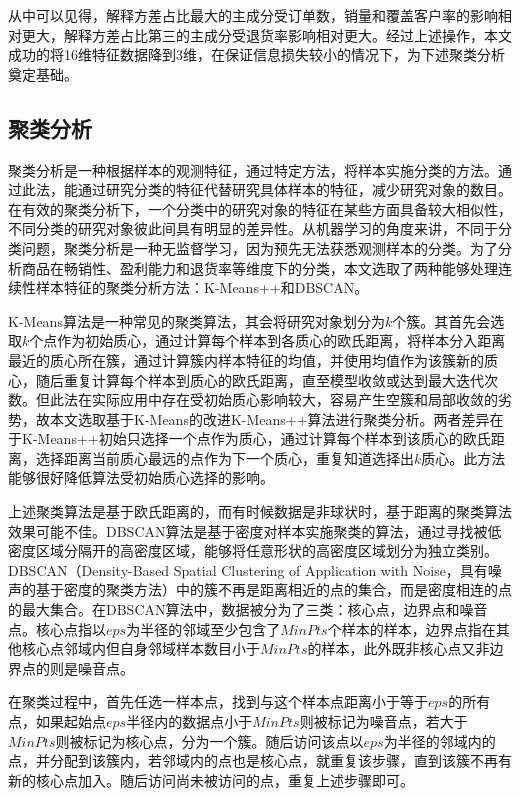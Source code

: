 \documentclass[lang=cn,11pt,a4paper,cite=authoryear]{elegantpaper}
\begin{document}
从中可以见得，解释方差占比最大的主成分受订单数，销量和覆盖客户率的影响相对更大，解释方差占比第三的主成分受退货率影响相对更大。经过上述操作，本文成功的将16维特征数据降到3维，在保证信息损失较小的情况下，为下述聚类分析奠定基础。

\subsection{聚类分析}

聚类分析是一种根据样本的观测特征，通过特定方法，将样本实施分类的方法。通过此法，能通过研究分类的特征代替研究具体样本的特征，减少研究对象的数目。在有效的聚类分析下，一个分类中的研究对象的特征在某些方面具备较大相似性，不同分类的研究对象彼此间具有明显的差异性。从机器学习的角度来讲，不同于分类问题，聚类分析是一种无监督学习，因为预先无法获悉观测样本的分类。为了分析商品在畅销性、盈利能力和退货率等维度下的分类，本文选取了两种能够处理连续性样本特征的聚类分析方法：K-Means++和DBSCAN。

K-Means算法是一种常见的聚类算法，其会将研究对象划分为$k$个簇。其首先会选取$k$个点作为初始质心，通过计算每个样本到各质心的欧氏距离，将样本分入距离最近的质心所在簇，通过计算簇内样本特征的均值，并使用均值作为该簇新的质心，随后重复计算每个样本到质心的欧氏距离，直至模型收敛或达到最大迭代次数。但此法在实际应用中存在受初始质心影响较大，容易产生空簇和局部收敛的劣势，故本文选取基于K-Means的改进K-Means++算法进行聚类分析。两者差异在于K-Means++初始只选择一个点作为质心，通过计算每个样本到该质心的欧氏距离，选择距离当前质心最远的点作为下一个质心，重复知道选择出$k$质心。此方法能够很好降低算法受初始质心选择的影响。

上述聚类算法是基于欧氏距离的，而有时候数据是非球状时，基于距离的聚类算法效果可能不佳。DBSCAN算法是基于密度对样本实施聚类的算法，通过寻找被低密度区域分隔开的高密度区域，能够将任意形状的高密度区域划分为独立类别。DBSCAN（Density-Based Spatial Clustering of Application with Noise，具有噪声的基于密度的聚类方法）中的簇不再是距离相近的点的集合，而是密度相连的点的最大集合。在DBSCAN算法中，数据被分为了三类：核心点，边界点和噪音点。核心点指以$eps$为半径的邻域至少包含了$MinPts$个样本的样本，边界点指在其他核心点邻域内但自身邻域样本数目小于$MinPts$的样本，此外既非核心点又非边界点的则是噪音点。

在聚类过程中，首先任选一样本点，找到与这个样本点距离小于等于$eps$的所有点，如果起始点$eps$半径内的数据点小于$MinPts$则被标记为噪音点，若大于$MinPts$则被标记为核心点，分为一个簇。随后访问该点以$eps$为半径的邻域内的点，并分配到该簇内，若邻域内的点也是核心点，就重复该步骤，直到该簇不再有新的核心点加入。随后访问尚未被访问的点，重复上述步骤即可。
\end{document}
